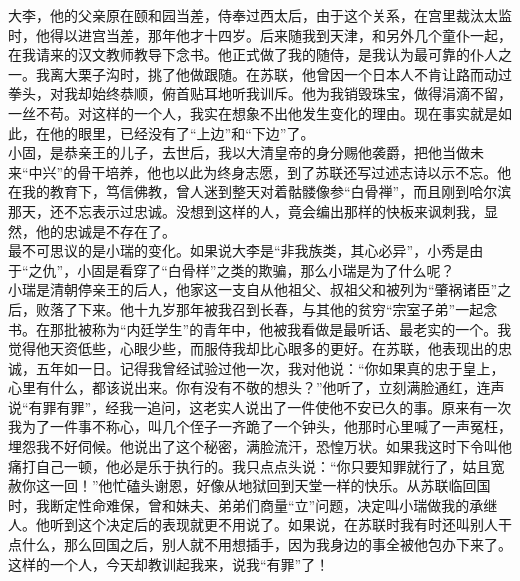 大李，他的父亲原在颐和园当差，侍奉过西太后，由于这个关系，在宫里裁汰太监时，他得以进宫当差，那年他才十四岁。后来随我到天津，和另外几个童仆一起，在我请来的汉文教师教导下念书。他正式做了我的随侍，是我认为最可靠的仆人之一。我离大栗子沟时，挑了他做跟随。在苏联，他曾因一个日本人不肯让路而动过拳头，对我却始终恭顺，俯首贴耳地听我训斥。他为我销毁珠宝，做得涓滴不留，一丝不苟。对这样的一个人，我实在想象不出他发生变化的理由。现在事实就是如此，在他的眼里，已经没有了“上边”和“下边”了。\\

小固，是恭亲王的儿子，去世后，我以大清皇帝的身分赐他袭爵，把他当做未来“中兴”的骨干培养，他也以此为终身志愿，到了苏联还写过述志诗以示不忘。他在我的教育下，笃信佛教，曾人迷到整天对着骷髅像参“白骨禅”，而且刚到哈尔滨那天，还不忘表示过忠诚。没想到这样的人，竟会编出那样的快板来讽刺我，显然，他的忠诚是不存在了。\\

最不可思议的是小瑞的变化。如果说大李是“非我族类，其心必异”，小秀是由于“之仇”，小固是看穿了“白骨样”之类的欺骗，那么小瑞是为了什么呢？\\

小瑞是清朝停亲王的后人，他家这一支自从他祖父、叔祖父和被列为“肇祸诸臣”之后，败落了下来。他十九岁那年被我召到长春，与其他的贫穷“宗室子弟”一起念书。在那批被称为“内廷学生”的青年中，他被我看做是最听话、最老实的一个。我觉得他天资低些，心眼少些，而服侍我却比心眼多的更好。在苏联，他表现出的忠诚，五年如一日。记得我曾经试验过他一次，我对他说：“你如果真的忠于皇上，心里有什么，都该说出来。你有没有不敬的想头？”他听了，立刻满脸通红，连声说“有罪有罪”，经我一追问，这老实人说出了一件使他不安已久的事。原来有一次我为了一件事不称心，叫几个侄子一齐跪了一个钟头，他那时心里喊了一声冤枉，埋怨我不好伺候。他说出了这个秘密，满脸流汗，恐惶万状。如果我这时下令叫他痛打自己一顿，他必是乐于执行的。我只点点头说：“你只要知罪就行了，姑且宽赦你这一回！”他忙磕头谢恩，好像从地狱回到天堂一样的快乐。从苏联临回国时，我断定性命难保，曾和妹夫、弟弟们商量“立”问题，决定叫小瑞做我的承继人。他听到这个决定后的表现就更不用说了。如果说，在苏联时我有时还叫别人干点什么，那么回国之后，别人就不用想插手，因为我身边的事全被他包办下来了。这样的一个人，今天却教训起我来，说我“有罪”了！\\

